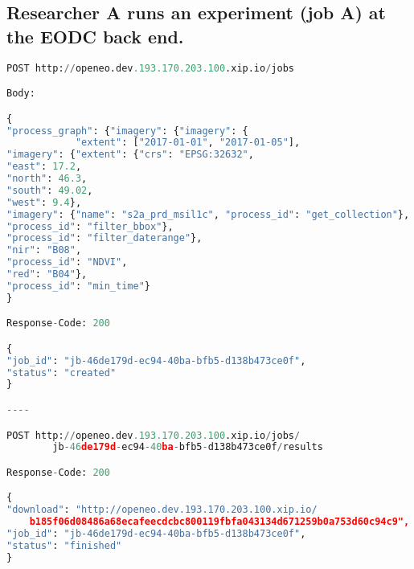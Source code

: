 \documentclass[draft,final]{vutinfth} %
\begin{document}
\subsection{Researcher A runs an experiment (job A) at the EODC back end.}
\begin{lstlisting}[frame=single, language=Python]
POST http://openeo.dev.193.170.203.100.xip.io/jobs

Body:

{ 
"process_graph": {"imagery": {"imagery": {
			"extent": ["2017-01-01", "2017-01-05"],
"imagery": {"extent": {"crs": "EPSG:32632",
"east": 17.2,
"north": 46.3,
"south": 49.02,
"west": 9.4},
"imagery": {"name": "s2a_prd_msil1c", "process_id": "get_collection"},
"process_id": "filter_bbox"},
"process_id": "filter_daterange"},
"nir": "B08",
"process_id": "NDVI",
"red": "B04"},
"process_id": "min_time"}
}

Response-Code: 200

{
"job_id": "jb-46de179d-ec94-40ba-bfb5-d138b473ce0f",
"status": "created"
}

----

POST http://openeo.dev.193.170.203.100.xip.io/jobs/
		jb-46de179d-ec94-40ba-bfb5-d138b473ce0f/results

Response-Code: 200

{
"download": "http://openeo.dev.193.170.203.100.xip.io/
	b185f06d08486a68ecafeecdcbc800119fbfa043134d671259b0a753d60c94c9", 
"job_id": "jb-46de179d-ec94-40ba-bfb5-d138b473ce0f",
"status": "finished"
}

\end{lstlisting}
\end{document}
